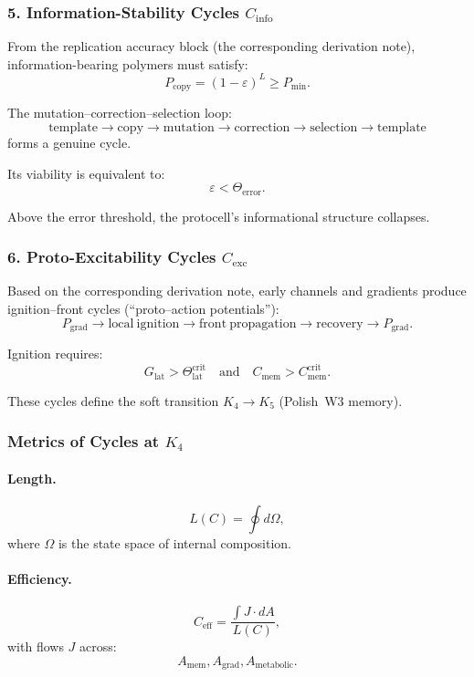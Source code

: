 \subsubsection{5. Information-Stability Cycles $C_{\mathrm{info}}$}

From the replication accuracy block (the corresponding derivation note),
information-bearing polymers must satisfy:
\[
  P_{\mathrm{copy}}=(1-\varepsilon)^L \ge P_{\min}.
\]

The mutation–correction–selection loop:
\[
  \mathrm{template}
  \to \mathrm{copy}
  \to \mathrm{mutation}
  \to \mathrm{correction}
  \to \mathrm{selection}
  \to \mathrm{template}
\]
forms a genuine cycle.

Its viability is equivalent to:
\[
  \varepsilon < \Theta_{\mathrm{error}}.
\]

Above the error threshold, the protocell’s informational structure
collapses.

\subsubsection{6. Proto-Excitability Cycles $C_{\mathrm{exc}}$}

Based on the corresponding derivation note, early channels and gradients produce
ignition–front cycles (“proto–action potentials”):
\[
  P_{\mathrm{grad}} \to
  \mathrm{local\ ignition} \to
  \mathrm{front\ propagation} \to
  \mathrm{recovery} \to
  P_{\mathrm{grad}}.
\]

Ignition requires:
\[
  G_{\mathrm{lat}} > \Theta^{\mathrm{crit}}_{\mathrm{lat}}
\quad\text{and}\quad
  C_{\mathrm{mem}}>C_{\mathrm{mem}}^{\mathrm{crit}}.
\]

These cycles define the soft transition $K_4\to K_5$ 
(Polish~W3 memory).

\subsubsection{Metrics of Cycles at \texorpdfstring{$K_4$}{K_4}}

\paragraph{Length.}
\[
  L(C)=\oint d\Omega,
\]
where $\Omega$ is the state space of internal composition.

\paragraph{Efficiency.}
\[
  C_{\mathrm{eff}}
    =\frac{\int J\cdot dA}{L(C)},
\]
with flows $J$ across:
\[
  A_{\mathrm{mem}}, A_{\mathrm{grad}}, A_{\mathrm{metabolic}}.
\]

